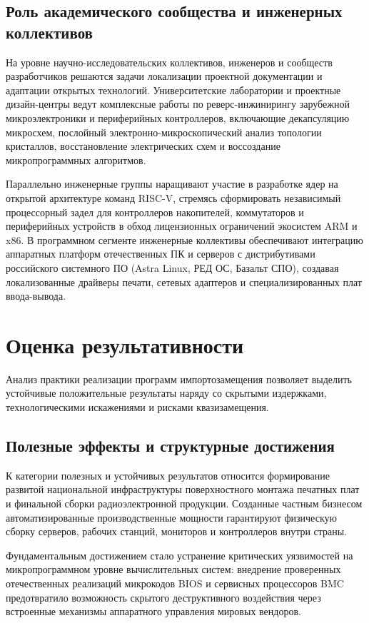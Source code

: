 \documentclass[12pt,a4paper]{article}
\begin{document}
\subsection{Роль академического сообщества и инженерных коллективов}

На уровне научно-исследовательских коллективов, инженеров и сообществ 
разработчиков решаются задачи локализации проектной документации и 
адаптации открытых технологий. Университетские лаборатории и проектные 
дизайн-центры ведут комплексные работы по реверс-инжинирингу 
зарубежной микроэлектроники и периферийных контроллеров, включающие 
декапсуляцию микросхем, послойный электронно-микроскопический анализ 
топологии кристаллов, восстановление электрических схем и воссоздание 
микропрограммных алгоритмов.

Параллельно инженерные группы наращивают участие в разработке ядер 
на открытой архитектуре команд RISC-V, стремясь сформировать 
независимый процессорный задел для контроллеров накопителей, 
коммутаторов и периферийных устройств в обход лицензионных 
ограничений экосистем ARM и x86. В программном сегменте инженерные 
коллективы обеспечивают интеграцию аппаратных платформ отечественных 
ПК и серверов с дистрибутивами российского системного ПО 
(Astra Linux, РЕД ОС, Базальт СПО), создавая локализованные 
драйверы печати, сетевых адаптеров и специализированных плат 
ввода-вывода.

\section{Оценка результативности}

Анализ практики реализации программ импортозамещения позволяет 
выделить устойчивые положительные результаты наряду со скрытыми 
издержками, технологическими искажениями и рисками квазизамещения.

\subsection{Полезные эффекты и структурные достижения}

К категории полезных и устойчивых результатов относится формирование 
развитой национальной инфраструктуры поверхностного монтажа печатных 
плат и финальной сборки радиоэлектронной продукции. Созданные частным 
бизнесом автоматизированные производственные мощности гарантируют 
физическую сборку серверов, рабочих станций, мониторов и контроллеров 
внутри страны. 

Фундаментальным достижением стало устранение критических уязвимостей 
на микропрограммном уровне вычислительных систем: внедрение 
проверенных отечественных реализаций микрокодов BIOS и сервисных 
процессоров BMC предотвратило возможность скрытого деструктивного 
воздействия через встроенные механизмы аппаратного управления 
мировых вендоров. 
\end{document}
